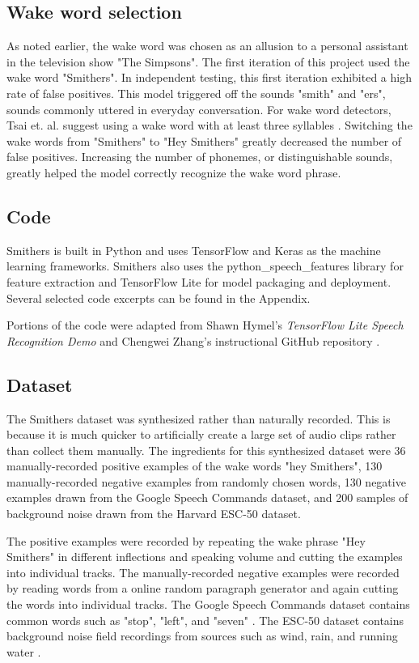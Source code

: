 \documentclass[conference]{IEEEtran}
\begin{document}
\subsection{Wake word selection}
As noted earlier, the wake word was chosen
as an allusion to a personal assistant in the television show "The Simpsons".
The first iteration of this project used the wake word "Smithers".
In independent testing, this first iteration exhibited a high rate of false positives. 
This model triggered off the sounds "smith" and "ers",
sounds commonly uttered in everyday conversation.
For wake word detectors, Tsai et. al. suggest using a wake word
with at least three syllables \cite{syllables}. 
Switching the wake words from "Smithers" to "Hey Smithers"
greatly decreased the number of false positives.
Increasing the number of phonemes, or distinguishable sounds, greatly helped the model 
correctly recognize the wake word phrase.

\subsection{Code}
Smithers is built in Python and uses TensorFlow and Keras as the machine learning frameworks.
Smithers also uses the python\_speech\_features library for feature extraction
and TensorFlow Lite for model packaging and deployment.
Several selected code excerpts can be found in the Appendix.

Portions of the code were adapted from Shawn Hymel's \textit{TensorFlow Lite Speech Recognition Demo}
and Chengwei Zhang's instructional GitHub repository \cite{hymel} \cite{tony}.

\subsection{Dataset} \label{sec:dataset}
The Smithers dataset was synthesized rather than naturally recorded.
This is because it is much quicker to artificially create a large set of audio clips
rather than collect them manually.
The ingredients for this synthesized dataset were 
36 manually-recorded positive examples of the wake words "hey Smithers",
130 manually-recorded negative examples from randomly chosen words,
130 negative examples drawn from the Google Speech Commands dataset,
and 200 samples of background noise drawn from the Harvard ESC-50 dataset.

The positive examples were recorded by repeating the wake phrase "Hey Smithers"
in different inflections and speaking volume
and cutting the examples into individual tracks.
The manually-recorded negative examples were recorded 
by reading words from a online random paragraph generator
and again cutting the words into individual tracks.
The Google Speech Commands dataset contains common words such as "stop", "left", and "seven" \cite{aiblog}.
The ESC-50 dataset contains background noise field recordings
from sources such as wind, rain, and running water \cite{noise}.
\end{document}
